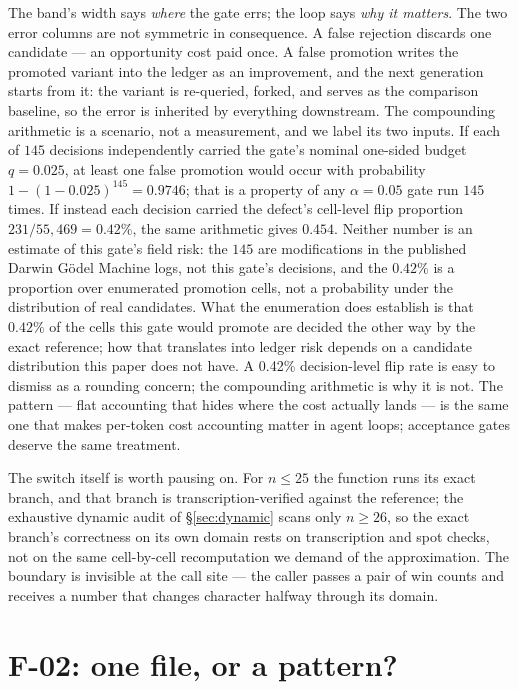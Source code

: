 \documentclass[10pt]{article}
\begin{document}
The band's width says \emph{where} the gate errs; the loop says \emph{why it
matters}. The two error columns are not symmetric in consequence. A false
rejection discards one candidate --- an opportunity cost paid once. A false
promotion writes the promoted variant into the ledger as an improvement, and
the next generation starts from it: the variant is re-queried, forked, and
serves as the comparison baseline, so the error is inherited by everything
downstream. The compounding arithmetic is a scenario, not a measurement, and we label its
two inputs. If each of $145$ decisions independently carried the gate's nominal
one-sided budget $q=0.025$, at least one false promotion would occur with
probability $1-(1-0.025)^{145}=0.9746$; that is a property of any $\alpha=0.05$
gate run $145$ times. If instead each decision carried the defect's cell-level
flip proportion $231/55{,}469=0.42\%$, the same arithmetic gives $0.454$.
Neither number is an estimate of this gate's field risk: the $145$ are
modifications in the published Darwin Gödel Machine logs, not this gate's
decisions, and the $0.42\%$ is a proportion over enumerated promotion cells,
not a probability under the distribution of real candidates. What the
enumeration does establish is that $0.42\%$ of the cells this gate would
promote are decided the other way by the exact reference; how that translates
into ledger risk depends on a candidate distribution this paper does not have. A 0.42\% decision-level flip rate is easy
to dismiss as a rounding concern; the compounding arithmetic is why it is not. The pattern --- flat accounting
that hides where the cost actually lands --- is the same one that makes
per-token cost accounting matter in agent loops; acceptance gates deserve
the same treatment.

The switch itself is worth pausing on. For $n \le 25$ the function runs its
exact branch, and that branch is transcription-verified against the
reference; the exhaustive dynamic audit of \S\ref{sec:dynamic} scans only
$n \ge 26$, so the exact branch's correctness on its own domain rests on
transcription and spot checks, not on the same cell-by-cell recomputation we
demand of the approximation. The boundary is invisible at the call site ---
the caller passes a pair of win counts and receives a number that changes
character halfway through its domain.

\section{F-02: one file, or a pattern?}\label{sec:f02}
\end{document}
